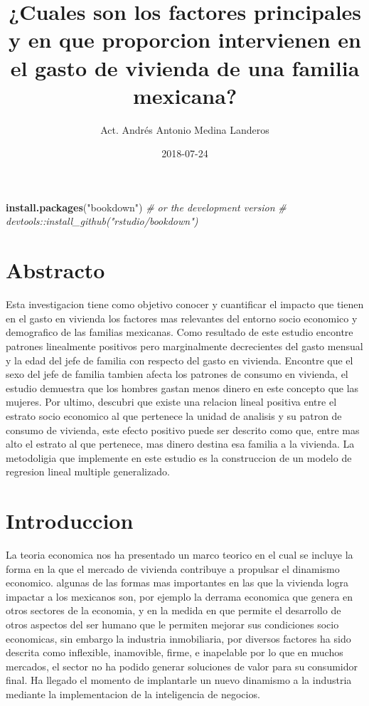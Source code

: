 \documentclass[]{book}
\title{¿Cuales son los factores principales y en que proporcion intervienen en
el gasto de vivienda de una familia mexicana?}
\author{Act. Andrés Antonio Medina Landeros}
\date{2018-07-24}
\newenvironment{Shaded}{\begin{snugshade}}{\end{snugshade}}
\newcommand{\KeywordTok}[1]{\textcolor[rgb]{0.13,0.29,0.53}{\textbf{#1}}}
\newcommand{\StringTok}[1]{\textcolor[rgb]{0.31,0.60,0.02}{#1}}
\newcommand{\CommentTok}[1]{\textcolor[rgb]{0.56,0.35,0.01}{\textit{#1}}}
\newcommand{\NormalTok}[1]{#1}
\begin{document}
\maketitle

{
\setcounter{tocdepth}{1}
\tableofcontents
}
\begin{Shaded}
\begin{Highlighting}[]
\KeywordTok{install.packages}\NormalTok{(}\StringTok{"bookdown"}\NormalTok{)}
\CommentTok{# or the development version}
\CommentTok{# devtools::install_github("rstudio/bookdown")}
\end{Highlighting}
\end{Shaded}

\chapter{Abstracto}\label{abstracto}

Esta investigacion tiene como objetivo conocer y cuantificar el impacto
que tienen en el gasto en vivienda los factores mas relevantes del
entorno socio economico y demografico de las familias mexicanas. Como
resultado de este estudio encontre patrones linealmente positivos pero
marginalmente decrecientes del gasto mensual y la edad del jefe de
familia con respecto del gasto en vivienda. Encontre que el sexo del
jefe de familia tambien afecta los patrones de consumo en vivienda, el
estudio demuestra que los hombres gastan menos dinero en este concepto
que las mujeres. Por ultimo, descubri que existe una relacion lineal
positiva entre el estrato socio economico al que pertenece la unidad de
analisis y su patron de consumo de vivienda, este efecto positivo puede
ser descrito como que, entre mas alto el estrato al que pertenece, mas
dinero destina esa familia a la vivienda. La metodoligia que implemente
en este estudio es la construccion de un modelo de regresion lineal
multiple generalizado.

\chapter{Introduccion}\label{introduccion}

La teoria economica nos ha presentado un marco teorico en el cual se
incluye la forma en la que el mercado de vivienda contribuye a propulsar
el dinamismo economico. algunas de las formas mas importantes en las que
la vivienda logra impactar a los mexicanos son, por ejemplo la derrama
economica que genera en otros sectores de la economia, y en la medida en
que permite el desarrollo de otros aspectos del ser humano que le
permiten mejorar sus condiciones socio economicas, sin embargo la
industria inmobiliaria, por diversos factores ha sido descrita como
inflexible, inamovible, firme, e inapelable por lo que en muchos
mercados, el sector no ha podido generar soluciones de valor para su
consumidor final. Ha llegado el momento de implantarle un nuevo
dinamismo a la industria mediante la implementacion de la inteligencia
de negocios.
\end{document}
